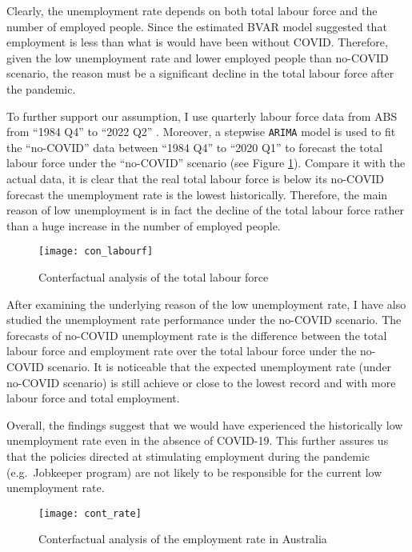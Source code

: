 \documentclass{monashthesis}
\begin{document}
Clearly, the unemployment rate depends on both total labour force and the number of employed people. Since the estimated BVAR model suggested that employment is less than what is would have been without COVID. Therefore, given the low unemployment rate and lower employed people than no-COVID scenario, the reason must be a significant decline in the total labour force after the pandemic.

To further support our assumption, I use quarterly labour force data from ABS from ``1984 Q4'' to ``2022 Q2'' \autocite{ABS2022}. Moreover, a stepwise \texttt{ARIMA} model \autocite{fpp3} is used to fit the ``no-COVID'' data between ``1984 Q4'' to ``2020 Q1'' to forecast the total labour force under the ``no-COVID'' scenario (see Figure \ref{fig:lab}). Compare it with the actual data, it is clear that the real total labour force is below its no-COVID forecast the unemployment rate is the lowest historically. Therefore, the main reason of low unemployment is in fact the decline of the total labour force rather than a huge increase in the number of employed people.

\begin{figure}[H]
\texttt{[image: con\_labourf]}
\centering
\caption{Conterfactual analysis of the total labour force}
\label{fig:lab}
\end{figure}

After examining the underlying reason of the low unemployment rate, I have also studied the unemployment rate performance under the no-COVID scenario. The forecasts of no-COVID unemployment rate is the difference between the total labour force and employment rate over the total labour force under the no-COVID scenario. It is noticeable that the expected unemployment rate (under no-COVID scenario) is still achieve or close to the lowest record and with more labour force and total employment.

Overall, the findings suggest that we would have experienced the historically low unemployment rate even in the absence of COVID-19. This further assures us that the policies directed at stimulating employment during the pandemic (e.g.~Jobkeeper program) are not likely to be responsible for the current low unemployment rate.

\begin{figure}[H]
\texttt{[image: cont\_rate]}
\centering
\caption{Conterfactual analysis of the employment rate in Australia}
\label{fig:unrate}
\end{figure}
\end{document}
